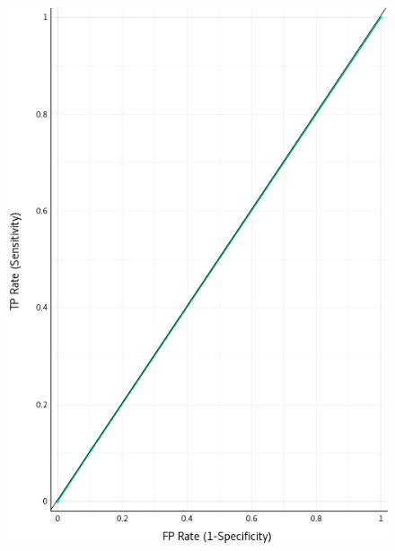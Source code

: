 \begin{figure}[H]
\begin{center}
    \includegraphics{figuras/roc_0-0.png}
\end{center}
\caption{}
\label{fig:class_0.00}
\end{figure}

